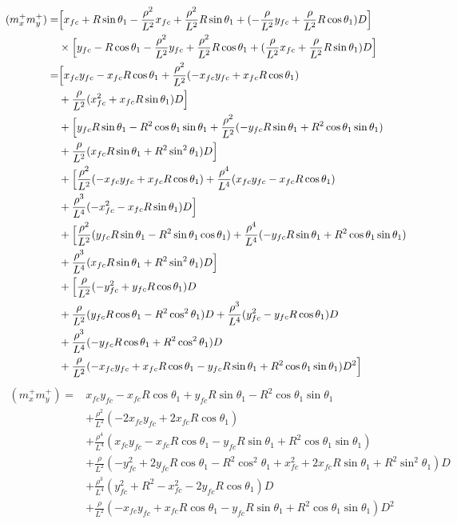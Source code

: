 \documentclass[12pt]{article}
\begin{document}
\begin{align}
    (m_x^+m_y^+) =& \Bigl[ x_{fc} +R\sin\theta_1 -\frac{\rho^2}{L^2}x_{fc} + \frac{\rho^2}{L^2}R\sin\theta_1 + (-\frac{\rho}{L^2}y_{fc} +\frac{\rho}{L^2}R\cos\theta_1)D  \Bigr] \nonumber\\
    &\times \Bigl[ y_{fc} -R\cos\theta_1 -\frac{\rho^2}{L^2}y_{fc}+\frac{\rho^2}{L^2}R\cos\theta_1 + (\frac{\rho}{L^2}x_{fc} + \frac{\rho}{L^2}R\sin\theta_1)D \Bigr]\\
    =& \Bigl[ x_{fc}y_{fc} -x_{fc}R\cos\theta_1 +\frac{\rho^2}{L^2}(-x_{fc}y_{fc} +x_{fc}R\cos\theta_1) \nonumber\\
    &+ \frac{\rho}{L^2}(x_{fc}^2 + x_{fc}R\sin\theta_1)D \Bigr] \nonumber\\
    &+ \Bigl[ y_{fc}R\sin\theta_1 -R^2\cos\theta_1\sin\theta_1 +\frac{\rho^2}{L^2}(-y_{fc}R\sin\theta_1 +R^2\cos\theta_1\sin\theta_1) \nonumber\\
    &+ \frac{\rho}{L^2}(x_{fc}R\sin\theta_1 + R^2\sin^2\theta_1)D \Bigr] \nonumber\\
    &+ \Bigl[ \frac{\rho^2}{L^2}(-x_{fc}y_{fc} +x_{fc}R\cos\theta_1) +\frac{\rho^4}{L^4}(x_{fc}y_{fc} -x_{fc}R\cos\theta_1)\nonumber\\
    &+ \frac{\rho^3}{L^4}(-x_{fc}^2 - x_{fc}R\sin\theta_1)D \Bigr] \nonumber\\
    &+ \Bigl[ \frac{\rho^2}{L^2}(y_{fc}R\sin\theta_1 -R^2\sin\theta_1\cos\theta_1) +\frac{\rho^4}{L^4}(-y_{fc}R\sin\theta_1 +R^2\cos\theta_1\sin\theta_1) \nonumber\\
    &+ \frac{\rho^3}{L^4}(x_{fc}R\sin\theta_1 + R^2\sin^2\theta_1)D \Bigr] \nonumber\\
    &+ \Bigl[\frac{\rho}{L^2}(-y_{fc}^2 + y_{fc}R\cos\theta_1)D \nonumber\\
    &+ \frac{\rho}{L^2}(y_{fc}R\cos\theta_1 -R^2\cos^2\theta_1)D + \frac{\rho^3}{L^4}(y_{fc}^2 -y_{fc}R\cos\theta_1)D \nonumber\\ 
    &+ \frac{\rho^3}{L^4} (-y_{fc}R\cos\theta_1 +R^2\cos^2\theta_1)D \nonumber\\
    &+ \frac{\rho}{L^2}(-x_{fc}y_{fc} + x_{fc}R\cos\theta_1 -y_{fc}R\sin\theta_1 +  R^2\cos\theta_1\sin\theta_1 )D^2 \Bigr]
\end{align}
\begin{align}
    (m_x^+m_y^+) =&  x_{fc}y_{fc} -x_{fc}R\cos\theta_1 + y_{fc}R\sin\theta_1 -R^2\cos\theta_1\sin\theta_1 \nonumber\\
    &+ \frac{\rho^2}{L^2}(-2x_{fc}y_{fc} +2x_{fc}R\cos\theta_1) \nonumber\\
    &+ \frac{\rho^4}{L^4}(x_{fc}y_{fc} -x_{fc}R\cos\theta_1 -y_{fc}R\sin\theta_1 +R^2\cos\theta_1\sin\theta_1) \nonumber\\
    &+ \frac{\rho}{L^2}(-y_{fc}^2 + 2y_{fc}R\cos\theta_1 -R^2\cos^2\theta_1 + x_{fc}^2 + 2x_{fc}R\sin\theta_1 + R^2\sin^2\theta_1)D \nonumber\\
    &+ \frac{\rho^3}{L^4}(y_{fc}^2 +R^2 -x_{fc}^2 -2y_{fc}R\cos\theta_1)D \nonumber\\
    &+ \frac{\rho}{L^2}(-x_{fc}y_{fc} + x_{fc}R\cos\theta_1 -y_{fc}R\sin\theta_1 +  R^2\cos\theta_1\sin\theta_1 )D^2
\end{align}
\end{document}
